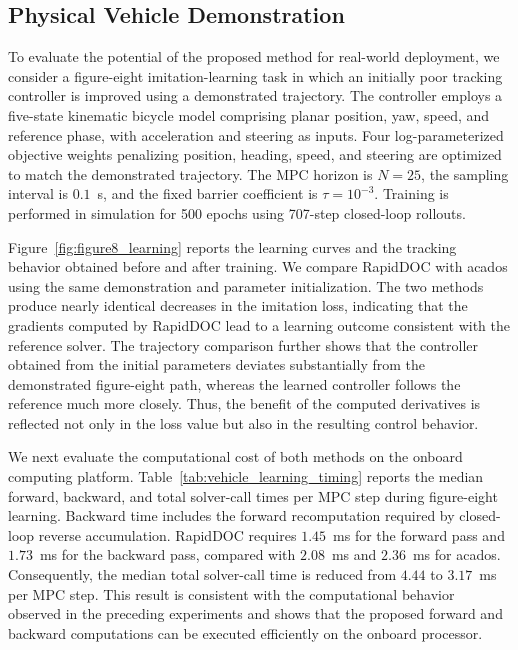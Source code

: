 \documentclass[letterpaper,10pt,conference]{ieeeconf}
\begin{document}
\subsection{Physical Vehicle Demonstration}
\label{sec:physical_vehicle}

To evaluate the potential of the proposed method for real-world
deployment, we consider a figure-eight imitation-learning task in which
an initially poor tracking controller is improved using a demonstrated
trajectory. The controller employs a five-state kinematic bicycle model
comprising planar position, yaw, speed, and reference phase, with
acceleration and steering as inputs. Four log-parameterized objective
weights penalizing position, heading, speed, and steering are optimized
to match the demonstrated trajectory. The MPC horizon is $N=25$, the
sampling interval is $0.1$~s, and the fixed barrier coefficient is
$\tau=10^{-3}$. Training is performed in simulation for 500 epochs using
707-step closed-loop rollouts.

Figure~\ref{fig:figure8_learning} reports the learning curves and the
tracking behavior obtained before and after training. We compare RapidDOC
with acados using the same demonstration and parameter initialization.
The two methods produce nearly identical decreases in the imitation
loss, indicating that the gradients computed by RapidDOC lead to a learning
outcome consistent with the reference solver. The trajectory comparison
further shows that the controller obtained from the initial parameters
deviates substantially from the demonstrated figure-eight path, whereas
the learned controller follows the reference much more closely. Thus,
the benefit of the computed derivatives is reflected not only in the
loss value but also in the resulting control behavior.



We next evaluate the computational cost of both methods on the onboard
computing platform. Table~\ref{tab:vehicle_learning_timing} reports the
median forward, backward, and total solver-call times per MPC step during
figure-eight learning. Backward time includes the forward recomputation
required by closed-loop reverse accumulation. RapidDOC requires $1.45$~ms
for the forward pass and $1.73$~ms for the backward pass, compared with
$2.08$~ms and $2.36$~ms for acados. Consequently, the median total
solver-call time is reduced from $4.44$ to $3.17$~ms per MPC step. This
result is consistent with the computational behavior observed in the
preceding experiments and shows that the proposed forward and backward
computations can be executed efficiently on the onboard processor.
\end{document}

